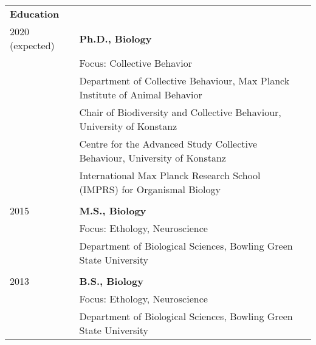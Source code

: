 \documentclass[letterpaper,7pt,oneside]{article}
\begin{document}
\begin{small}
\noindent \begin{longtable}{@{} l p{5.3in}l}



\Large{\textbf{Education}} \vspace{5mm} \\
 \large{2020 (expected)} 
 & \textbf{Ph.D., Biology} \\
 & Focus: Collective Behavior \\
 & {Department of Collective Behaviour, Max Planck Institute of Animal Behavior} \\
  & {Chair of Biodiversity and Collective Behaviour, University of Konstanz} \\
    & {Centre for the Advanced Study Collective Behaviour, University of Konstanz} \\
 	& {International Max Planck Research School (IMPRS) for Organismal Biology} \\
     
     & \\
 \large{2015} 
  & \textbf{M.S., Biology} \\
 & Focus: Ethology, Neuroscience \\
     & {Department of Biological Sciences, Bowling Green State University} \\
    
     & \\
 \large{2013} 
  &\textbf{B.S., Biology} \\
 & Focus: Ethology, Neuroscience \\
      & {Department of Biological Sciences, Bowling Green State University} \\
    

\end{longtable}
\end{small}
\end{document}
